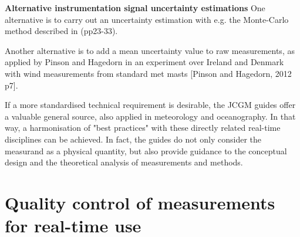 \textbf{Alternative instrumentation signal uncertainty estimations}
One alternative is to carry out an uncertainty estimation with e.g. the Monte-Carlo method described in \cite{jcgm2011} (pp23-33). 

Another alternative is to add a mean uncertainty value to raw measurements, as applied by Pinson and Hagedorn \cite{PinsonHagedorn2012} in an experiment over Ireland and Denmark with wind measurements from standard met masts [Pinson and Hagedorn, 2012 p7]. 

If a more standardised technical requirement is desirable, the JCGM guides \cite{jcgm2008,jcgm2008a,jcgm2009, jcgm2011,jcgm2012} offer a valuable general source, also applied in meteorology and oceanography. In that way, a harmonisation of "best practices" with these directly related real-time disciplines can be achieved. In fact, the guides do not only consider the measurand as a physical quantity, but also provide guidance to the conceptual design and the theoretical analysis of measurements and methods. 



\section{Quality control of measurements for real-time use}\label{sec:quality_control}

{\color{blue}{Author: COM -- needs more authors/discussion}}




